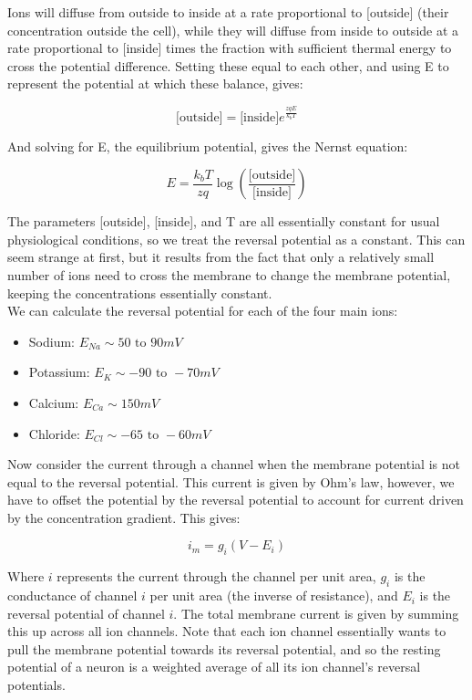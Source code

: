 \documentclass{article}
\begin{document}
Ions will diffuse from outside to inside at a rate proportional to [outside] (their concentration outside the cell), while they will diffuse from inside to outside at a rate proportional to [inside] times the fraction with sufficient thermal energy to cross the potential difference. Setting these equal to each other, and using E to represent the potential at which these balance, gives:

\begin{equation*}
    \text{[outside]} = \text{[inside]}e^{\frac{zqE}{k_bT}}
\end{equation*}

And solving for E, the equilibrium potential, gives the Nernst equation:

\begin{equation*}
    E = \frac{k_bT}{zq} \log\left(\frac{\text{[outside]}}{\text{[inside]}}\right)
\end{equation*}

The parameters [outside], [inside], and T are all essentially constant for usual physiological conditions, so we treat the reversal potential as a constant. This can seem strange at first, but it results from the fact that only a relatively small number of ions need to cross the membrane to change the membrane potential, keeping the concentrations essentially constant.\\

We can calculate the reversal potential for each of the four main ions:

\begin{itemize}
    \item Sodium: $E_{Na} \sim 50\text{ to }90mV$
    \item Potassium: $E_{K} \sim -90\text{ to }-70mV$
    \item Calcium: $E_{Ca} \sim 150mV$
    \item Chloride: $E_{Cl} \sim -65\text{ to }-60mV$
\end{itemize}

Now consider the current through a channel when the membrane potential is not equal to the reversal potential. This current is given by Ohm's law, however, we have to offset the potential by the reversal potential to account for current driven by the concentration gradient. This gives:

\begin{equation*}
    i_m = g_i(V-E_i)
\end{equation*}

Where $i$ represents the current through the channel per unit area, $g_i$ is the conductance of channel $i$ per unit area (the inverse of resistance), and $E_i$ is the reversal potential of channel $i$. The total membrane current is given by summing this up across all ion channels. Note that each ion channel essentially wants to pull the membrane potential towards its reversal potential, and so the resting potential of a neuron is a weighted average of all its ion channel's reversal potentials.\\
\end{document}
